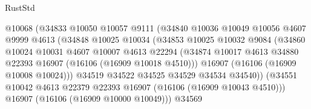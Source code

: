 \begin{lexlean}{RustStd}
\begin{coremodule}
                                    @10068
                                    (@34833
                                      @10050
                                      @10057
                                      @9111
                                      (@34840
                                        @10036
                                        @10049
                                        @10056
                                        @4607
                                        @9999
                                        @4613
                                        (@34848
                                          @10025
                                          @10034
                                          (@34853
                                            @10025
                                            @10032
                                            @9084
                                            (@34860
                                              @10024
                                              @10031
                                              @4607
                                              @10007
                                              @4613
                                              @22294
                                              (@34874
                                                @10017
                                                @4613
                                                @34880
                                                @22393
                                                @16907
                                                (@16106 (@16909 @10018 @4510)))
                                              @16907
                                              (@16106 (@16909 @10008 @10024)))
                                            @34519
                                            @34522
                                            @34525
                                            @34529
                                            @34534
                                            @34540))
                                        (@34551
                                          @10042
                                          @4613
                                          @22379
                                          @22393
                                          @16907
                                          (@16106 (@16909 @10043 @4510)))
                                        @16907
                                        (@16106 (@16909 @10000 @10049)))
                                      @34569

\end{coremodule}
\end{lexlean}
